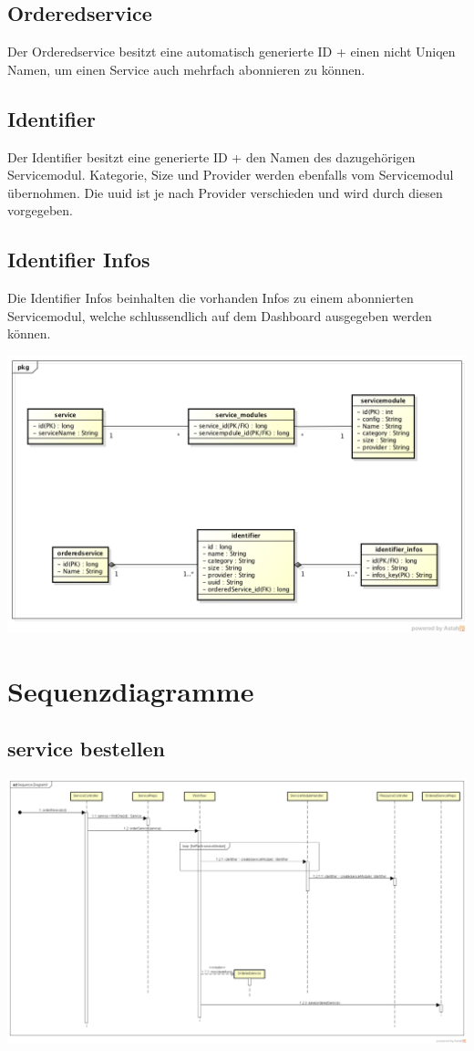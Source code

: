 \subsection{Orderedservice}
Der Orderedservice besitzt eine automatisch generierte ID + einen nicht Uniqen 
Namen, um einen Service auch mehrfach abonnieren zu können.

\subsection{Identifier}
Der Identifier besitzt eine generierte ID + den Namen des dazugehörigen 
Servicemodul.
Kategorie, Size und Provider werden ebenfalls vom Servicemodul übernohmen.
Die uuid ist je nach Provider verschieden und wird durch diesen vorgegeben.

\subsection{Identifier Infos}
Die Identifier Infos beinhalten die vorhanden Infos zu einem abonnierten 
Servicemodul, welche schlussendlich auf dem Dashboard ausgegeben werden können.

\includegraphics[width=\textwidth]{./05_Design/04_Architektur/Datenmodell}

\section{Sequenzdiagramme}
\subsection{service bestellen}

\begin{center}
\includegraphics[width=\textwidth]{./05_Design/04_Architektur/orderService}
\end{center}
